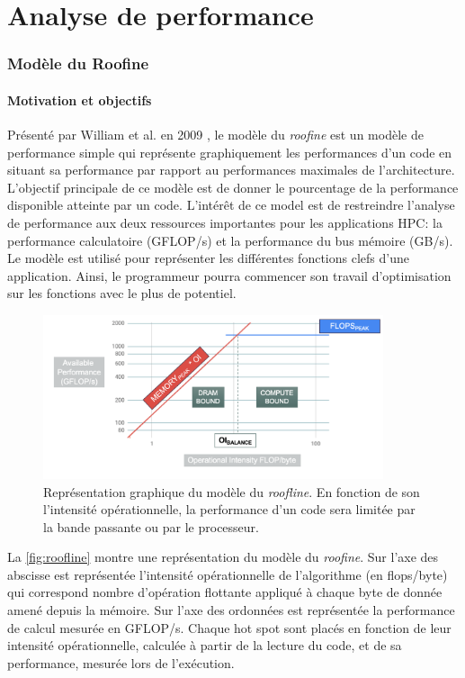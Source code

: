\section{Analyse de performance}\label{sec:edl_perf_analyse}


\subsubsection{Modèle du Roofine} \label{sec:roofline}

\paragraph{Motivation et objectifs}
Présenté par William et al. en 2009 \cite{Williams2008}, le modèle du \textit{roofine} est un modèle de performance simple qui représente graphiquement les performances d’un code en situant sa performance par rapport au performances maximales de l’architecture. L’objectif principale de ce modèle est de donner le pourcentage de la performance disponible atteinte par un code. L’intérêt de ce model est de restreindre l’analyse de performance aux deux ressources importantes pour les applications HPC: la performance calculatoire (GFLOP/s) et la performance du bus mémoire (GB/s).
Le modèle est utilisé pour représenter les différentes fonctions clefs d’une application. Ainsi, le programmeur pourra commencer son travail d’optimisation sur les fonctions avec le plus de potentiel.

\begin{figure}
    \center
    \includegraphics[width=10cm]{images/roofline.png}
    \caption{\label{fig:roofline} Représentation graphique du modèle du \textit{roofline}. En fonction de son l'intensité opérationnelle, la performance d'un code sera limitée par la bande passante ou par le processeur.}
\end{figure}


La \autoref{fig:roofline} montre une représentation du modèle du \textit{roofine}. Sur l’axe des abscisse est représentée l’intensité opérationnelle de l’algorithme (en flops/byte) qui correspond nombre d’opération flottante appliqué à chaque byte de donnée amené depuis la mémoire. Sur l’axe des ordonnées est représentée la performance de calcul mesurée en GFLOP/s.
Chaque hot spot sont placés en fonction de leur intensité opérationnelle, calculée à partir de la lecture du code, et de sa performance, mesurée lors de l’exécution.

